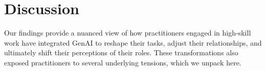 \section{Discussion}
Our findings provide a nuanced view of how practitioners engaged in high-skill work have integrated GenAI to reshape their tasks, adjust their relationships, and ultimately shift their perceptions of their roles. These transformations also exposed practitioners to several underlying tensions, which we unpack here.
 

















